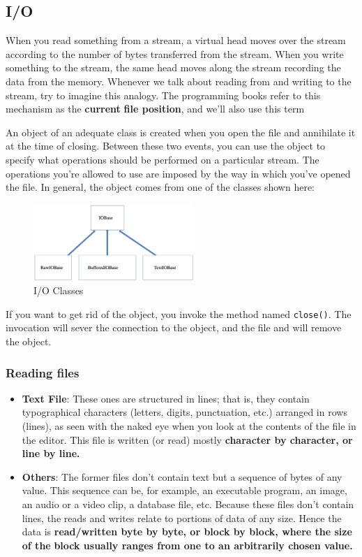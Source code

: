 \documentclass[11pt]{article}
\begin{document}
\newpage

\subsection{I/O}
\label{sec:org4fce709}
When you read something from a stream, a virtual head moves over the
stream according to the number of bytes transferred from the stream.
When you write something to the stream, the same head moves along the
stream recording the data from the memory.  Whenever we talk about
reading from and writing to the stream, try to imagine this
analogy. The programming books refer to this mechanism as the \textbf{current}
\textbf{file position}, and we’ll also use this term

An object of an adequate class is created when you open the file and
annihilate it at the time of closing.  Between these two events, you
can use the object to specify what operations should be performed on a
particular stream. The operations you’re allowed to use are imposed by
the way in which you’ve opened the file.  In general, the object comes
from one of the classes shown here: 

\begin{figure}[htbp]
\centering
\includegraphics[width=230px]{./images/IO.png}
\caption{I/O Classes}
\end{figure}

If you want to get rid of the object, you invoke the method named
\texttt{close()}. The invocation will sever the connection to the object, and
the file and will remove the object.

\newpage

\subsubsection{Reading files}
\label{sec:org96bc63e}
\begin{itemize}
\item \textbf{Text File}: These ones are structured in lines; that is, they contain
typographical characters (letters, digits, punctuation, etc.)
arranged in rows (lines), as seen with the naked eye when you look
at the contents of the file in the editor.  This file is written (or
read) mostly \textbf{character by character, or line by line.}
\item \textbf{Others}: The former files don’t contain text but a sequence of
bytes of any value. This sequence can be, for example, an executable
program, an image, an audio or a video clip, a database file,
etc. Because these files don’t contain lines, the reads and writes
relate to portions of data of any size. Hence the data is
\textbf{read/written byte by byte, or block by block, where the size of the}
\textbf{block usually ranges from one to an arbitrarily chosen value.}
\end{itemize}
\end{document}

